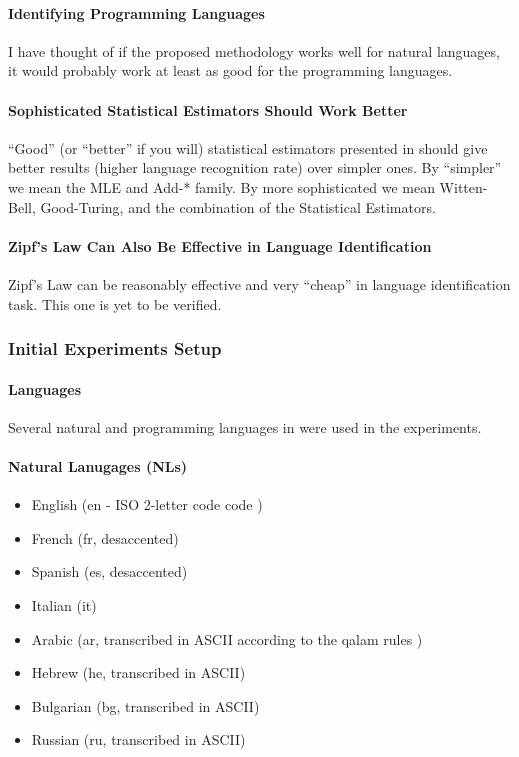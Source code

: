 \paragraph{Identifying Programming Languages}

I have thought of if the proposed methodology works well for natural
languages, it would probably work at least as good for the programming
languages.

\paragraph{Sophisticated Statistical Estimators Should Work Better}

``Good'' (or ``better'' if you will) statistical estimators presented in 
should give better results (higher language recognition rate) over simpler ones.
By ``simpler'' we mean the MLE and Add-* family. By more sophisticated we mean Witten-Bell,
Good-Turing, and the combination of the Statistical Estimators.

\paragraph{Zipf's Law Can Also Be Effective in Language Identification}

Zipf's Law can be reasonably effective and very ``cheap'' in language identification
task. This one is yet to be verified.

\subsubsection{Initial Experiments Setup}

\paragraph{Languages}

Several natural and programming languages in were used in the experiments.

\paragraph*{Natural Lanugages (NLs)}

\begin{itemize}
\item English (en - ISO 2-letter code code \cite{iso-codes})
\item French (fr, desaccented)
\item Spanish (es, desaccented)
\item Italian (it)
\item Arabic (ar, transcribed in ASCII according to the qalam rules \cite{qalam})
\item Hebrew (he, transcribed in ASCII)
\item Bulgarian (bg, transcribed in ASCII)
\item Russian (ru, transcribed in ASCII)
\end{itemize}

